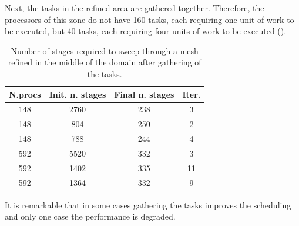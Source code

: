 \documentclass[letterpaper]{article}
\renewcommand{\(}{\left(}
\renewcommand{\)}{\right)}
\renewcommand{\[}{\left[}
\renewcommand{\]}{\right]}
\begin{document}
Next, the tasks in the refined area are gathered together.
Therefore, the processors of this zone do not have 160 tasks, each requiring one
unit of work to be executed, but 40 tasks, each requiring four units of work to
be executed (). 
\begin{table}[H]
  \begin{center}
    \begin{tabular}{|c|c|c|c|}
      \hline
      N.procs & Init. n. stages & Final n. stages & Iter. \\
      \hline
      148 & 2760 & 238 & 3  \\
      148 & 804  & 250 & 2  \\
      148 & 788  & 244 & 4  \\
      592 & 5520 & 332 & 3  \\
      592 & 1402 & 335 & 11 \\
      592 & 1364 & 332 & 9  \\
      \hline
    \end{tabular}
    \caption{Number of stages required to sweep through a mesh refined in the
      middle of the domain after gathering of the tasks.}
    \label{amr_2}
  \end{center}
\end{table}

It is remarkable that in some cases gathering the tasks improves the scheduling
and only one case the performance is degraded.
\end{document}
